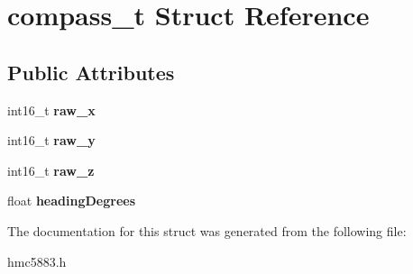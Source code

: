 \hypertarget{structcompass__t}{}\section{compass\+\_\+t Struct Reference}
\label{structcompass__t}
\subsection*{Public Attributes}
\begin{DoxyCompactItemize}
\item 
\mbox{\label{structcompass__t_aaa5323135e100dea4ba14a5e3d1dc555}} 
int16\+\_\+t {\bfseries raw\+\_\+x}
\item 
\mbox{\label{structcompass__t_a719b0ea8a5f9dda8804bf91b98d8cedf}} 
int16\+\_\+t {\bfseries raw\+\_\+y}
\item 
\mbox{\label{structcompass__t_ae7828390c86ad613fd89fa84526dc555}} 
int16\+\_\+t {\bfseries raw\+\_\+z}
\item 
\mbox{\label{structcompass__t_ac4778441994a1a67998c2fd2c3c422f1}} 
float {\bfseries heading\+Degrees}
\end{DoxyCompactItemize}


The documentation for this struct was generated from the following file\+:\begin{DoxyCompactItemize}
\item 
hmc5883.\+h\end{DoxyCompactItemize}

